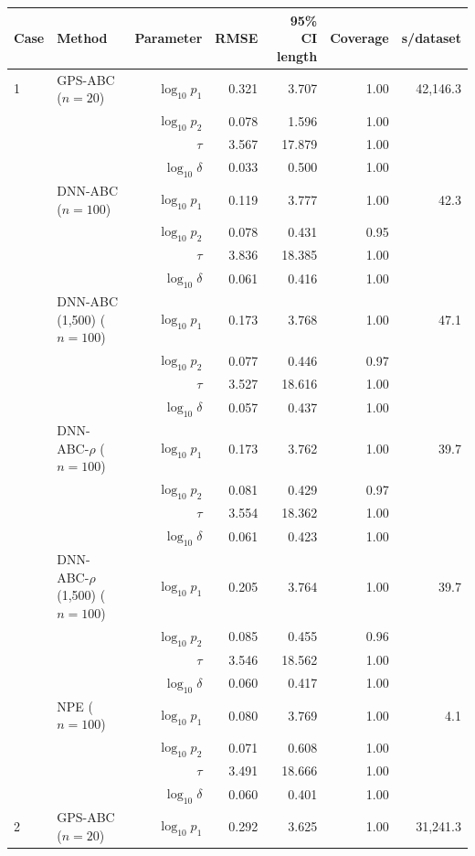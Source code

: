 \begin{tabular}{llrrrrr}
\toprule
Case & Method & Parameter & RMSE & 95\% CI length & Coverage & s/dataset \\
\midrule
1 & GPS-ABC ($n=20$) & $\log_{10}p_1$ & 0.321 & 3.707 & 1.00 & 42,146.3 \\
 &  & $\log_{10}p_2$ & 0.078 & 1.596 & 1.00 &  \\
 &  & $\tau$ & 3.567 & 17.879 & 1.00 &  \\
 &  & $\log_{10}\delta$ & 0.033 & 0.500 & 1.00 &  \\
 & DNN-ABC ($n=100$) & $\log_{10}p_1$ & 0.119 & 3.777 & 1.00 & 42.3 \\
 &  & $\log_{10}p_2$ & 0.078 & 0.431 & 0.95 &  \\
 &  & $\tau$ & 3.836 & 18.385 & 1.00 &  \\
 &  & $\log_{10}\delta$ & 0.061 & 0.416 & 1.00 &  \\
 & DNN-ABC (1,500) ($n=100$) & $\log_{10}p_1$ & 0.173 & 3.768 & 1.00 & 47.1 \\
 &  & $\log_{10}p_2$ & 0.077 & 0.446 & 0.97 &  \\
 &  & $\tau$ & 3.527 & 18.616 & 1.00 &  \\
 &  & $\log_{10}\delta$ & 0.057 & 0.437 & 1.00 &  \\
 & DNN-ABC-$\rho$ ($n=100$) & $\log_{10}p_1$ & 0.173 & 3.762 & 1.00 & 39.7 \\
 &  & $\log_{10}p_2$ & 0.081 & 0.429 & 0.97 &  \\
 &  & $\tau$ & 3.554 & 18.362 & 1.00 &  \\
 &  & $\log_{10}\delta$ & 0.061 & 0.423 & 1.00 &  \\
 & DNN-ABC-$\rho$ (1,500) ($n=100$) & $\log_{10}p_1$ & 0.205 & 3.764 & 1.00 & 39.7 \\
 &  & $\log_{10}p_2$ & 0.085 & 0.455 & 0.96 &  \\
 &  & $\tau$ & 3.546 & 18.562 & 1.00 &  \\
 &  & $\log_{10}\delta$ & 0.060 & 0.417 & 1.00 &  \\
 & NPE ($n=100$) & $\log_{10}p_1$ & 0.080 & 3.769 & 1.00 & 4.1 \\
 &  & $\log_{10}p_2$ & 0.071 & 0.608 & 1.00 &  \\
 &  & $\tau$ & 3.491 & 18.666 & 1.00 &  \\
 &  & $\log_{10}\delta$ & 0.060 & 0.401 & 1.00 &  \\
\midrule
2 & GPS-ABC ($n=20$) & $\log_{10}p_1$ & 0.292 & 3.625 & 1.00 & 31,241.3 \\

\end{tabular}

